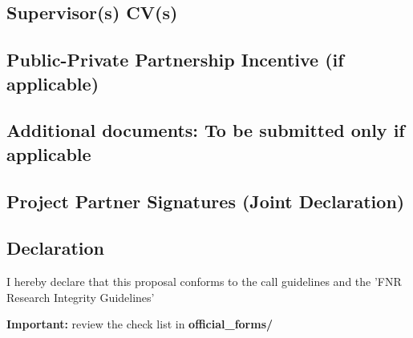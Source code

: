 \documentclass[11pt,twoside,a4paper]{article}
\begin{document}
\subsection{Supervisor(s) CV(s)}



\subsection{Public-Private Partnership Incentive (if applicable)}


\subsection{Additional documents: To be submitted only if applicable}


\subsection{Project Partner Signatures (Joint Declaration)}


\subsection{Declaration}


I hereby declare that this proposal conforms to the call guidelines and the 'FNR Research Integrity Guidelines'

\textbf{Important:} review the check list in \textbf{official\_forms/}
\end{document}
